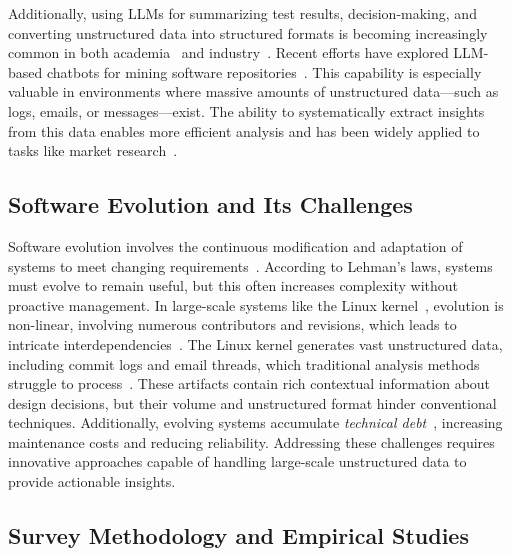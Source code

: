 \documentclass[sigconf,review,anonymous]{acmart}
\begin{document}
Additionally, using LLMs for summarizing test results, decision-making, and converting unstructured data into structured formats is becoming increasingly common in both academia~\cite{jin2024comprehensive,iourovitski2024grade,patel2024lotus} and industry~\cite{llmnvida}. Recent efforts have explored LLM-based chatbots for mining software repositories~\cite{llmchatbotsmsr2024}. This capability is especially valuable in environments where massive amounts of unstructured data—such as logs, emails, or messages—exist. The ability to systematically extract insights from this data enables more efficient analysis and has been widely applied to tasks like market research~\cite{brand2023using}.

\subsection{Software Evolution and Its Challenges}
Software evolution involves the continuous modification and adaptation of systems to meet changing requirements~\cite{lehman1996laws}. According to Lehman's laws, systems must evolve to remain useful, but this often increases complexity without proactive management. In large-scale systems like the Linux kernel~\cite{linux}, evolution is non-linear, involving numerous contributors and revisions, which leads to intricate interdependencies~\cite{israeli2010linux}. The Linux kernel generates vast unstructured data, including commit logs and email threads, which traditional analysis methods struggle to process~\cite{mens2008introduction}. These artifacts contain rich contextual information about design decisions, but their volume and unstructured format hinder conventional techniques. Additionally, evolving systems accumulate \emph{technical debt}~\cite{brown2010managing}, increasing maintenance costs and reducing reliability. Addressing these challenges requires innovative approaches capable of handling large-scale unstructured data to provide actionable insights.



\subsection{Survey Methodology and Empirical Studies}
\end{document}

